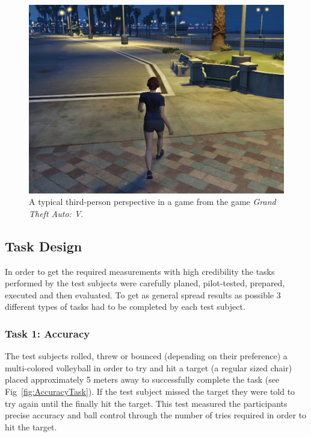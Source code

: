 \documentclass[runningheads,a4paper,oribibl]{llncs}
\begin{document}
\begin{figure}
   \centering
   \includegraphics[width=\textwidth]{ExternalMaterial/GTA}
   \caption{A typical third-person perspective in a game from the game \emph{Grand Theft Auto: V}. \label{fig:GTAIV}}
\end{figure}









\subsection{Task Design} \label{subsec:TaskDesign}

In order to get the required measurements with high credibility the tasks performed by the test subjects were carefully planed, pilot-tested, prepared, executed and then evaluated. To get as general spread results as possible 3 different types of tasks had to be completed by each test subject.

\subsubsection{Task 1: Accuracy}

The test subjects rolled, threw or bounced (depending on their preference) a multi-colored volleyball in order to try and hit a target (a regular sized chair) placed approximately 5 meters away to successfully complete the task (see Fig~\ref{fig:AccuracyTask}). If the test subject missed the target they were told to try again until the finally hit the target. This test measured the participants precise accuracy and ball control through the number of tries required in order to hit the target.
\end{document}
